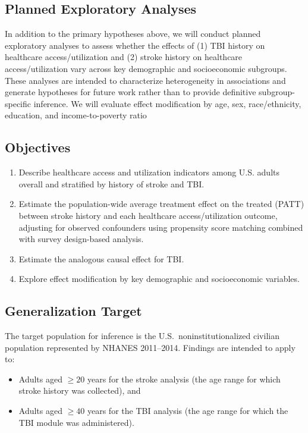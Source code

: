 \documentclass{article}
\begin{document}
\subsection{Planned Exploratory Analyses}

In addition to the primary hypotheses above, we will conduct planned exploratory analyses to
assess whether the effects of (1) TBI history on healthcare access/utilization and
(2) stroke history on healthcare access/utilization vary across key demographic and
socioeconomic subgroups. These analyses are intended to characterize heterogeneity in
associations and generate hypotheses for future work rather than to provide definitive
subgroup-specific inference.
We will evaluate effect modification by age, sex, race/ethnicity, education, and income-to-poverty ratio

\subsection{Objectives}

\begin{enumerate}
    \item Describe healthcare access and utilization indicators among U.S. adults overall and stratified by history of stroke and TBI.

    \item Estimate the population-wide average treatment effect on the treated (PATT) between stroke history and each healthcare access/utilization outcome, adjusting for observed confounders using propensity score matching combined with survey design-based analysis.

    \item Estimate the analogous causal effect for TBI.

    \item Explore effect modification by key demographic and socioeconomic variables.

\end{enumerate}

\subsection{Generalization Target}

The target population for inference is the U.S.\ noninstitutionalized civilian population represented by NHANES 2011--2014. Findings are intended to apply to:

\begin{itemize}
    \item Adults aged $\geq 20$ years for the stroke analysis (the age range for which stroke history was collected), and

    \item Adults aged $\geq 40$ years for the TBI analysis (the age range for which the TBI module was administered).
\end{itemize}
\end{document}
